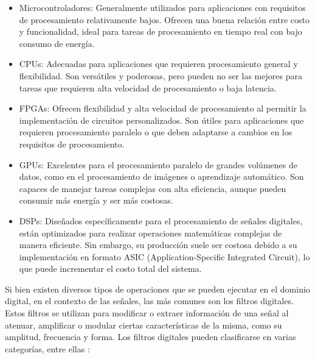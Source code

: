 \documentclass[]{book}
\begin{document}
\begin{itemize}
    \item  Microcontroladores: Generalmente utilizados para aplicaciones con requisitos de procesamiento relativamente bajos. Ofrecen una buena relación entre costo y funcionalidad, ideal para tareas de procesamiento en tiempo real con bajo consumo de energía.
    \item  CPUs: Adecuadas para aplicaciones que requieren procesamiento general y flexibilidad. Son versátiles y poderosas, pero pueden no ser las mejores para tareas que requieren alta velocidad de procesamiento o baja latencia.
    \item FPGAs: Ofrecen flexibilidad y alta velocidad de procesamiento al permitir la implementación de circuitos personalizados. Son útiles para aplicaciones que requieren procesamiento paralelo o que deben adaptarse a cambios en los requisitos de procesamiento.
    \item GPUs: Excelentes para el procesamiento paralelo de grandes volúmenes de datos, como en el procesamiento de imágenes o aprendizaje automático. Son capaces de manejar tareas complejas con alta eficiencia, aunque pueden consumir más energía y ser más costosas.
    \item DSPs: Diseñados específicamente para el procesamiento de señales digitales, están optimizados para realizar operaciones matemáticas complejas de manera eficiente. Sin embargo, su producción suele ser costosa debido a su implementación en formato ASIC (Application-Specific Integrated Circuit), lo que puede incrementar el costo total del sistema.
\end{itemize}

\noindent Si bien existen diversos tipos de operaciones que se pueden ejecutar en el dominio digital, en el contexto de las señales, las más comunes son los filtros digitales. Estos filtros se utilizan para modificar o extraer información de una señal al atenuar, amplificar o modular ciertas características de la misma, como su amplitud, frecuencia y forma. Los filtros digitales pueden clasificarse en varias categorías, entre ellas \cite{proakis2007digital}:
\end{document}
